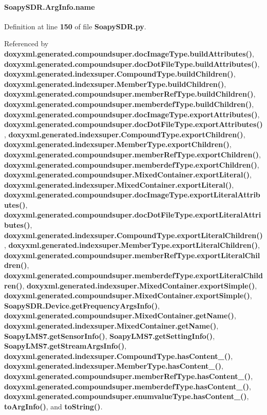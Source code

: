 \paragraph[{name}]{\setlength{\rightskip}{0pt plus 5cm}Soapy\+S\+D\+R.\+Arg\+Info.\+name\hspace{0.3cm}{\ttfamily [static]}}\label{classSoapySDR_1_1ArgInfo_aa9ec50002d63f514766aeb940f95303a}


Definition at line {\bf 150} of file {\bf Soapy\+S\+D\+R.\+py}.



Referenced by {\bf doxyxml.\+generated.\+compoundsuper.\+doc\+Image\+Type.\+build\+Attributes()}, {\bf doxyxml.\+generated.\+compoundsuper.\+doc\+Dot\+File\+Type.\+build\+Attributes()}, {\bf doxyxml.\+generated.\+indexsuper.\+Compound\+Type.\+build\+Children()}, {\bf doxyxml.\+generated.\+indexsuper.\+Member\+Type.\+build\+Children()}, {\bf doxyxml.\+generated.\+compoundsuper.\+member\+Ref\+Type.\+build\+Children()}, {\bf doxyxml.\+generated.\+compoundsuper.\+memberdef\+Type.\+build\+Children()}, {\bf doxyxml.\+generated.\+compoundsuper.\+doc\+Image\+Type.\+export\+Attributes()}, {\bf doxyxml.\+generated.\+compoundsuper.\+doc\+Dot\+File\+Type.\+export\+Attributes()}, {\bf doxyxml.\+generated.\+indexsuper.\+Compound\+Type.\+export\+Children()}, {\bf doxyxml.\+generated.\+indexsuper.\+Member\+Type.\+export\+Children()}, {\bf doxyxml.\+generated.\+compoundsuper.\+member\+Ref\+Type.\+export\+Children()}, {\bf doxyxml.\+generated.\+compoundsuper.\+memberdef\+Type.\+export\+Children()}, {\bf doxyxml.\+generated.\+compoundsuper.\+Mixed\+Container.\+export\+Literal()}, {\bf doxyxml.\+generated.\+indexsuper.\+Mixed\+Container.\+export\+Literal()}, {\bf doxyxml.\+generated.\+compoundsuper.\+doc\+Image\+Type.\+export\+Literal\+Attributes()}, {\bf doxyxml.\+generated.\+compoundsuper.\+doc\+Dot\+File\+Type.\+export\+Literal\+Attributes()}, {\bf doxyxml.\+generated.\+indexsuper.\+Compound\+Type.\+export\+Literal\+Children()}, {\bf doxyxml.\+generated.\+indexsuper.\+Member\+Type.\+export\+Literal\+Children()}, {\bf doxyxml.\+generated.\+compoundsuper.\+member\+Ref\+Type.\+export\+Literal\+Children()}, {\bf doxyxml.\+generated.\+compoundsuper.\+memberdef\+Type.\+export\+Literal\+Children()}, {\bf doxyxml.\+generated.\+indexsuper.\+Mixed\+Container.\+export\+Simple()}, {\bf doxyxml.\+generated.\+compoundsuper.\+Mixed\+Container.\+export\+Simple()}, {\bf Soapy\+S\+D\+R.\+Device.\+get\+Frequency\+Args\+Info()}, {\bf doxyxml.\+generated.\+compoundsuper.\+Mixed\+Container.\+get\+Name()}, {\bf doxyxml.\+generated.\+indexsuper.\+Mixed\+Container.\+get\+Name()}, {\bf Soapy\+L\+M\+S7.\+get\+Sensor\+Info()}, {\bf Soapy\+L\+M\+S7.\+get\+Setting\+Info()}, {\bf Soapy\+L\+M\+S7.\+get\+Stream\+Args\+Info()}, {\bf doxyxml.\+generated.\+indexsuper.\+Compound\+Type.\+has\+Content\+\_\+()}, {\bf doxyxml.\+generated.\+indexsuper.\+Member\+Type.\+has\+Content\+\_\+()}, {\bf doxyxml.\+generated.\+compoundsuper.\+member\+Ref\+Type.\+has\+Content\+\_\+()}, {\bf doxyxml.\+generated.\+compoundsuper.\+memberdef\+Type.\+has\+Content\+\_\+()}, {\bf doxyxml.\+generated.\+compoundsuper.\+enumvalue\+Type.\+has\+Content\+\_\+()}, {\bf to\+Arg\+Info()}, and {\bf to\+String()}.

